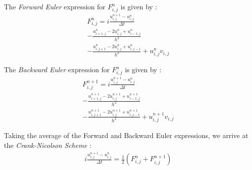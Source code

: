 \documentclass[10pt, nofootinbib, twocolumn]{revtex4-1}
\begin{document}
The \textit{Forward Euler} expression for \( F_{i,j}^n \) is given by \cite{notes}: \\
\begin{equation}\label{eq:forward}
    \begin{split}
        F_{i,j}^n = i \frac{u^{n+1}_{i,j}-u^{n}_{i,j}}{\Delta t} \\
        -\frac{u^n_{i+1,j}-2u^n_{i,j}+u^n_{i-1,j}}{h^2} \\
        - \frac{u^n_{i,j+1}-2u^n_{i,j}+u^n_{i,j-1} }{h^2} + u^n_{i,j}v_{i,j}
    \end{split}
\end{equation}

The \textit{Backward Euler} expression for \( F_{i,j}^n \) is given by \cite{notes}: \\
\begin{equation}\label{eq:backward}
    \begin{split}
        F_{i,j}^{n+1} = i \frac{u^{n+1}_{i,j}-u^{n}_{i,j}}{\Delta t} \\
        -\frac{u^{n+1}_{i+1,j}- 2u^{n+1}_{i,j}+u^{n+1}_{i-1,j}}{h^2} \\ -  \frac{u^{n+1}_{i,j+1}-2u^{n+1}_{i,j}+u^{n+1}_{i,j-1} }{h^2} + u^{n+1}_{i,j}v_{i,j}
    \end{split}
\end{equation}

Taking the average of the Forward and Backward Euler expressions, we arrive at the \textit{Crank-Nicolson Scheme} \cite{notes}: 
\begin{equation}\label{eq:crank}
    \begin{split}
        i \frac{u^{n+1}_{i,j}-u^{n}_{i,j}}{\Delta t} = \frac{1}{2}(F_{i,j}^n+F_{i,j}^{n+1})  
    \end{split}
\end{equation}
\end{document}
